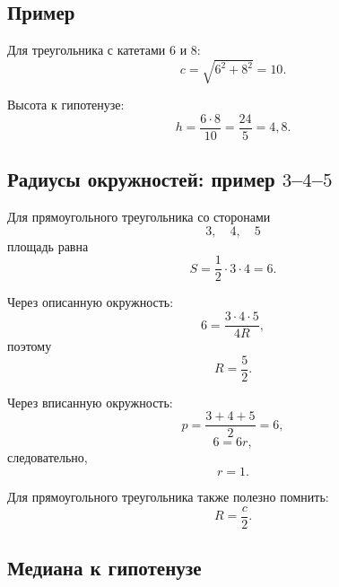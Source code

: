 \documentclass[a4paper,12pt]{article}
\begin{document}
\subsection*{Пример}

Для треугольника с катетами \(6\) и \(8\):
\[
c=\sqrt{6^2+8^2}=10.
\]

Высота к гипотенузе:
\[
h=\frac{6\cdot8}{10}
=
\frac{24}{5}
=
4{,}8.
\]


\subsection*{Радиусы окружностей: пример \(3\)--\(4\)--\(5\)}

Для прямоугольного треугольника со сторонами
\[
3,\quad4,\quad5
\]
площадь равна
\[
S=\frac12\cdot3\cdot4=6.
\]

Через описанную окружность:
\[
6=\frac{3\cdot4\cdot5}{4R},
\]
поэтому
\[
R=\frac52.
\]

Через вписанную окружность:
\[
p=\frac{3+4+5}{2}=6,
\]
\[
6=6r,
\]
следовательно,
\[
r=1.
\]

Для прямоугольного треугольника также полезно помнить:
\[
\boxed{R=\frac{c}{2}}.
\]


\subsection*{Медиана к гипотенузе}

\begin{center}
\end{center}
\end{document}
